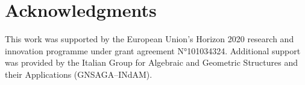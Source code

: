 \documentclass[
    crop=false,
    a4paper,
    10pt,
]{article}
\begin{document}
\section*{Acknowledgments}  
This work was supported by the European Union’s Horizon 2020 research and innovation programme under grant agreement N°101034324. Additional support was provided by the Italian Group for Algebraic and Geometric Structures and their Applications (GNSAGA–INdAM).  

\bigskip
			
			



\end{document}
